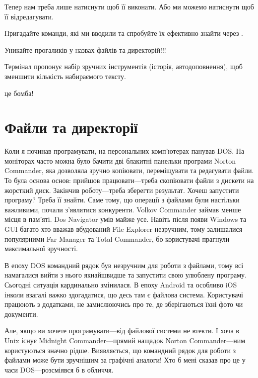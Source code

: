 Тепер нам треба лише натиснути \keys{\return} щоб її виконати.
Або ми можемо натиснути \keys{\arrowkeyright} щоб її відредагувати.

\begin{exercise}
Пригадайте команди, які ми вводили та спробуйте їх ефективно знайти через .
\end{exercise}

\begin{summary}
\item Уникайте прогаликів у назвах файлів та директорій!!!
\item Термінал пропонує набір зручних інструментів (історія, автодоповнення), щоб зменшити кількість набираємого тексту.
\item {} це бомба!
\end{summary}

\section{Файли та директорії}

Коли я починав програмувати, на персональних комп'ютерах панував DOS.
На моніторах часто можна було бачити дві блакитні панельки програми Norton Commander,
яка дозволяла зручно копіювати, переміщувати та редагувати файли.
То була основа основ: прийшов працювати---треба скопіювати файли з дискети на жорсткий диск.
Закінчив роботу---треба зберегти результат.
Хочеш запустити програму?  Треба її знайти.
Саме тому, що операції з файлами були настільки важливими, почали з'являтися конкуренти.
Volkov Commander займав менше місця в пам'яті.
Dos Navigator умів майже усе.
Навіть після появи Windows та GUI багато хто вважав вбудований File Explorer незручним,
тому залишалися популярними Far Manager та Total Commander,
бо користувачі прагнули максимальної зручності.

В епоху DOS командний рядок був незручним для роботи з файлами,
тому всі намагалися вийти з нього якнайшвидше та запустити свою улюблену програму.
Сьогодні ситуація кардинально змінилася.
В епоху Android та особливо iOS інколи взагалі важко здогадатися, що десь там є файлова система.
Користувачі працюють з додатками, не замислюючись про те, де зберігаються їхні фото чи документи.

Але, якщо ви хочете програмувати---від файлової системи не втекти.
І хоча в Unix існує Midnight Commander---прямий нащадок Norton Commander---ним користуються значно рідше.
Виявляється, що командний рядок для роботи з файлами може бути зручнішим за графічні аналоги!
Хто б мені сказав про це у часи DOS---розсміявся б в обличчя.

